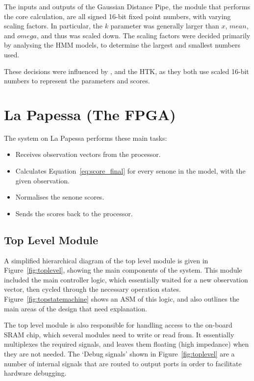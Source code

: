 	The inputs and outputs of the Gaussian Distance Pipe, the module that performs the core calculation, are all signed 16-bit fixed point numbers, with varying scaling factors.  In particular, the $k$ parameter was generally larger than $x$, $mean$, and $omega$, and thus was scaled down.  The scaling factors were decided primarily by analysing the HMM models, to determine the largest and smallest numbers used.

	These decisions were influenced by \cite{melnikoff2003speech}, and the HTK, as they both use scaled 16-bit numbers to represent the parameters and scores.


\section{La Papessa (The FPGA)} %
\label{sec:la_papessa_fpga}

	The system on La Papessa performs these main tasks:
	\begin{itemize}
		\item Receives observation vectors from the processor.
		\item Calculates Equation~\ref{eq:score_final} for every senone in the model, with the given observation.
		\item Normalises the senone scores.
		\item Sends the scores back to the processor.
	\end{itemize}

	\subsection{Top Level Module} %
	\label{sub:top_level_module}
		A simplified hierarchical diagram of the top level module is given in Figure~\ref{fig:toplevel}, showing the main components of the system.  This module included the main controller logic, which essentially waited for a new observation vector, then cycled through the necessary operation states.  Figure~\ref{fig:topstatemachine} shows an ASM of this logic, and also outlines the main areas of the design that need explanation.

		The top level module is also responsible for handling access to the on-board SRAM chip, which several modules need to write or read from.  It essentially multiplexes the required signals, and leaves them floating (high impedance) when they are not needed.  The `Debug signals' shown in Figure~\ref{fig:toplevel} are a number of internal signals that are routed to output ports in order to facilitate hardware debugging.

